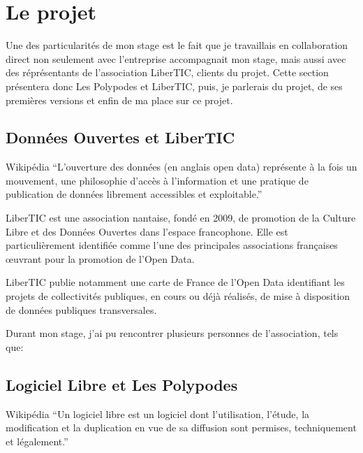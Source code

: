 \section{Le projet}

Une des particularités de mon stage est le fait que je travaillais en collaboration direct non seulement avec l'entreprise accompagnait mon stage, mais aussi avec des réprésentants de l'association LiberTIC, clients du projet. Cette section présentera donc Les Polypodes et LiberTIC, puis, je parlerais du projet, de ses premières versions et enfin de ma place sur ce projet.

\subsection{Données Ouvertes et LiberTIC}

\begin{aquote}{Wikipédia}
``L'ouverture des données (en anglais open data) représente à la fois un mouvement, une philosophie d'accès à l'information et une pratique de publication de données librement accessibles et exploitable.''
\end{aquote}


LiberTIC est une association nantaise, fondé en 2009, de promotion de la Culture Libre et des Données Ouvertes dans l'espace francophone. Elle est particulièrement identifiée comme l'une des principales associations françaises œuvrant pour la promotion de l'Open Data.

LiberTIC publie notamment une carte de France de l'Open Data\cite{cartopendata} identifiant les projets de collectivités publiques, en cours ou déjà réalisés, de mise à disposition de données publiques transversales.

Durant mon stage, j'ai pu rencontrer plusieurs personnes de l'association, tels que:


\subsection{Logiciel Libre et Les Polypodes}

\begin{aquote}{Wikipédia}
``Un logiciel libre est un logiciel dont l'utilisation, l'étude, la modification et la duplication en vue de sa diffusion sont permises, techniquement et légalement.''
\end{aquote}

